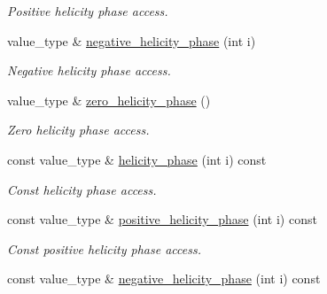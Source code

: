 \begin{DoxyCompactItemize}
\begin{DoxyCompactList}\small\item\em Positive helicity phase access. \end{DoxyCompactList}\item 
\hypertarget{a00275_a53728fd2d71a048b384e06b2b9b8a5e7}{}value\+\_\+type \& \hyperlink{a00275_a53728fd2d71a048b384e06b2b9b8a5e7}{negative\+\_\+helicity\+\_\+phase} (int i)\label{a00275_a53728fd2d71a048b384e06b2b9b8a5e7}

\begin{DoxyCompactList}\small\item\em Negative helicity phase access. \end{DoxyCompactList}\item 
\hypertarget{a00275_aa9365d9eca35c397b79e87bee4649ac2}{}value\+\_\+type \& \hyperlink{a00275_aa9365d9eca35c397b79e87bee4649ac2}{zero\+\_\+helicity\+\_\+phase} ()\label{a00275_aa9365d9eca35c397b79e87bee4649ac2}

\begin{DoxyCompactList}\small\item\em Zero helicity phase access. \end{DoxyCompactList}\item 
\hypertarget{a00275_aaaf246643011e27d709381d8cbf15aed}{}const value\+\_\+type \& \hyperlink{a00275_aaaf246643011e27d709381d8cbf15aed}{helicity\+\_\+phase} (int i) const \label{a00275_aaaf246643011e27d709381d8cbf15aed}

\begin{DoxyCompactList}\small\item\em Const helicity phase access. \end{DoxyCompactList}\item 
\hypertarget{a00275_a5e29c9516044c5482e057a0327da134f}{}const value\+\_\+type \& \hyperlink{a00275_a5e29c9516044c5482e057a0327da134f}{positive\+\_\+helicity\+\_\+phase} (int i) const \label{a00275_a5e29c9516044c5482e057a0327da134f}

\begin{DoxyCompactList}\small\item\em Const positive helicity phase access. \end{DoxyCompactList}\item 
\hypertarget{a00275_aa35fa9590cf61e931bb66260d7499a13}{}const value\+\_\+type \& \hyperlink{a00275_aa35fa9590cf61e931bb66260d7499a13}{negative\+\_\+helicity\+\_\+phase} (int i) const \label{a00275_aa35fa9590cf61e931bb66260d7499a13}


\end{DoxyCompactItemize}

